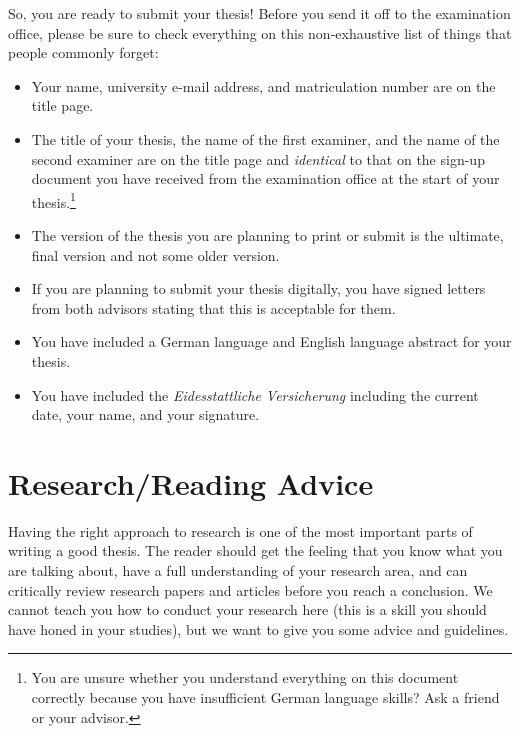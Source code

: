 \documentclass[a4paper]{article}
\begin{document}
So, you are ready to submit your thesis!
Before you send it off to the examination office, please be sure to check everything on this non-exhaustive list of things that people commonly forget:

\begin{itemize}
    \item Your name, university e-mail address, and matriculation number are on the title page.
    \item The title of your thesis, the name of the first examiner, and the name of the second examiner are on the title page and \emph{identical} to that on the sign-up document you have received from the examination office at the start of your thesis.\footnote{You are unsure whether you understand everything on this document correctly because you have insufficient German language skills? Ask a friend or your advisor.}
    \item The version of the thesis you are planning to print or submit is the ultimate, final version and not some older version.
    \item If you are planning to submit your thesis digitally, you have signed letters from both advisors stating that this is acceptable for them.
    \item You have included a German language and English language abstract for your thesis.
    \item You have included the \emph{Eidesstattliche Versicherung} including the current date, your name, and your signature.
\end{itemize}

\section{Research/Reading Advice}
\label{sec:research}

Having the right approach to research is one of the most important parts of writing a good thesis.
The reader should get the feeling that you know what you are talking about, have a full understanding of your research area, and can critically review research papers and articles before you reach a conclusion.
We cannot teach you how to conduct your research here (this is a skill you should have honed in your studies), but we want to give you some advice and guidelines.
\end{document}

